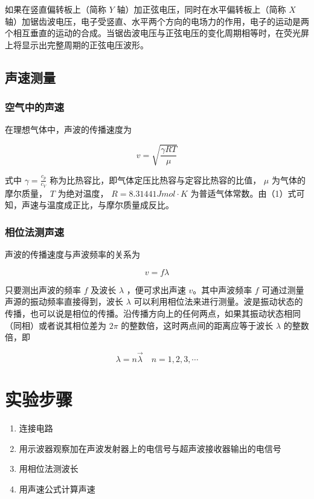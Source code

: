 \documentclass[12pt,a4paper]{amsart}
\begin{document}
如果在竖直偏转板上（简称 $Y$ 轴）加正弦电压，同时在水平偏转板上（简称 $X$ 轴）加锯齿波电压，电子受竖直、水平两个方向的电场力的作用，电子的运动是两个相互垂直的运动的合成。当锯齿波电压与正弦电压的变化周期相等时，在荧光屏上将显示出完整周期的正弦电压波形。

\subsection{声速测量}

\subsubsection{空气中的声速}

在理想气体中，声波的传播速度为

\begin{equation}
    v = \sqrt{\frac{\gamma RT}{\mu}}
\end{equation}

式中 $\gamma = \frac{c_p}{c_V}$ 称为比热容比，即气体定压比热容与定容比热容的比值， $\mu$ 为气体的摩尔质量， $T$ 为绝对温度， $R=8.31441 J mol\cdot K$ 为普适气体常数。由（1）式可知，声速与温度成正比，与摩尔质量成反比。

\subsubsection{相位法测声速}

声波的传播速度与声波频率的关系为

\begin{equation}
    v = f\lambda
\end{equation}

只要测出声波的频率 $f$ 及波长 $\lambda$ ，便可求出声速 $v$。其中声波频率 $f$ 可通过测量声源的振动频率直接得到，波长 $\lambda$ 可以利用相位法来进行测量。波是振动状态的传播，也可以说是相位的传播。沿传播方向上的任何两点，如果其振动状态相同（同相）或者说其相位差为 $2\pi$ 的整数倍，这时两点间的距离应等于波长 $\lambda$ 的整数倍，即

\begin{equation}
    \lambda = n \vec{\lambda}\quad n = 1,2,3,\cdots
\end{equation}

\section{实验步骤}

\begin{enumerate}
    \item 连接电路
    \item 用示波器观察加在声波发射器上的电信号与超声波接收器输出的电信号
    \item 用相位法测波长
    \item 用声速公式计算声速
\end{enumerate}
\end{document}
